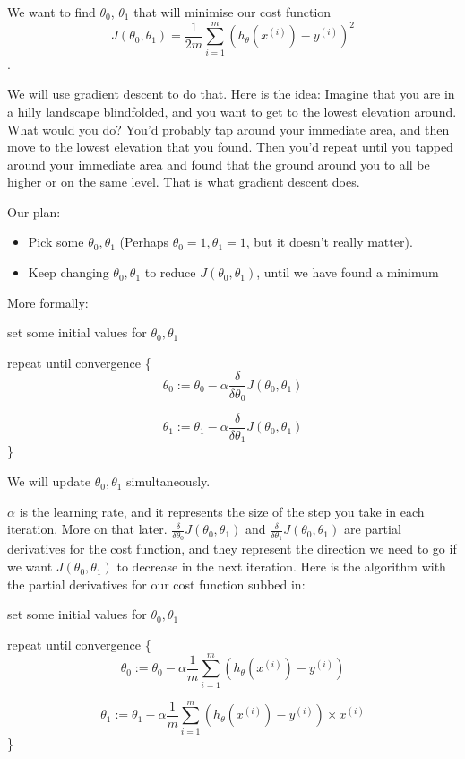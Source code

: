 \documentclass[12pt]{article}
\begin{document}
We want to find $\theta_0$, $\theta_1$ that will minimise our cost function \[J(\theta_0, \theta_1) = \frac{1}{2m} \sum^m_{i=1}(h_\theta(x^{(i)}) - y^{(i)})^2\].

We will use gradient descent to do that. Here is the idea: Imagine that you are in a hilly landscape blindfolded, and you want to get to the lowest elevation around. What would you do? You'd probably tap around your immediate area, and then move to the lowest elevation that you found. Then you'd repeat until you tapped around your immediate area and found that the ground around you to all be higher or on the same level. That is what gradient descent does.

Our plan:
\begin{itemize}
\item Pick some $\theta_0, \theta_1$ (Perhaps $\theta_0=1, \theta_1=1$, but it doesn't really matter).
\item Keep changing  $\theta_0, \theta_1$ to reduce $J(\theta_0, \theta_1)$, until we have found a minimum
\end{itemize}

More formally:

set some initial values for $\theta_0, \theta_1$

repeat until convergence \{
\[\theta_0 := \theta_0 - \alpha \frac{\delta}{\delta \theta_0} J(\theta_0, \theta_1)\]

\[\theta_1 := \theta_1 - \alpha \frac{\delta}{\delta \theta_1} J(\theta_0, \theta_1)\]
\}


We will update  $\theta_0, \theta_1$ simultaneously.

$\alpha$ is the learning rate, and it represents the size of the step you take in each iteration. More on that later.  $\frac{\delta}{\delta \theta_0} J(\theta_0, \theta_1) $ and $\frac{\delta}{\delta \theta_1} J(\theta_0, \theta_1) $ are partial derivatives for the cost function, and they represent the direction we need to go if we want $J(\theta_0, \theta_1)$ to decrease in the next iteration. Here is the algorithm with the partial derivatives for our cost function subbed in:

set some initial values for $\theta_0, \theta_1$

repeat until convergence \{
\[\theta_0 := \theta_0 - \alpha \frac{1}{m} \sum^m_{i=1} (h_\theta(x^{(i)}) - y^{(i)} )\]

\[\theta_1 := \theta_1 - \alpha \frac{1}{m} \sum^m_{i=1} (h_\theta(x^{(i)}) - y^{(i)}) \times x^{(i)}\]
\}
\end{document}
